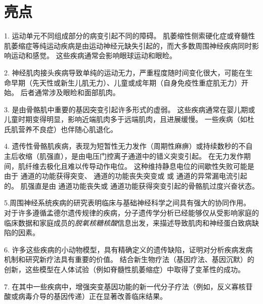 \section{亮点}

1. 运动单元不同组成部分的病变引起不同的障碍。
肌萎缩性侧索硬化症或脊髓性肌萎缩症等纯运动疾病是由运动神经元缺失引起的，而大多数周围神经疾病同时影响运动和感觉。
这些疾病通常会影响眼球运动和眼睑。


2. 神经肌肉接头疾病导致单纯的运动无力，严重程度随时间变化很大，可能在生命早期（先天性或新生儿肌无力）、儿童或成年期（自身免疫性重症肌无力）开始。
后者通常涉及眼睑和面部肌肉。


3. 是由骨骼肌中重要的基因突变引起许多形式的虚弱。
这些疾病通常在婴儿期或儿童时期变得明显，影响近端肌肉多于远端肌肉，且进展缓慢。
一些疾病（如杜氏肌营养不良症）也伴随心肌退化。


4. 遗传性骨骼肌疾病，表现为短暂性无力发作（周期性麻痹）或持续数秒的不自主后收缩（肌强直），是由电压门控离子通道中的错义突变引起。
在无力发作期间，肌纤维去极化且难以传导动作电位。
这种维持静息电位的间歇性失败可能是由于  通道的功能获得突变、 通道的功能丧失突变或  或  通道的异常漏电流引起的。
肌强直是由  通道功能丧失或  通道功能获得突变引起的骨骼肌过度兴奋状态。


5.周围神经系统疾病的研究表明临床与基础神经科学之间具有强大的协同作用。
对于许多遵循孟德尔遗传规律的疾病，分子遗传学分析已经能够仅从受影响家庭的临床数据和家庭成员的\textit{脱氧核糖核酸}信息出发，来描述导致肌肉和神经蛋白致病缺陷的因素。


6. 许多这些疾病的小动物模型，具有精确定义的遗传缺陷，证明对分析疾病发病机制和研究新疗法具有重要的价值。
结合新生物疗法（基因疗法、基因沉默）的创新，这些模型在人体试验（例如脊髓性肌萎缩症）中取得了变革性的成功。


7. 在其中一些疾病中，增强突变基因功能的新一代分子疗法（例如，反义寡核苷酸或病毒介导的基因传递）正在显著改善临床结果。


